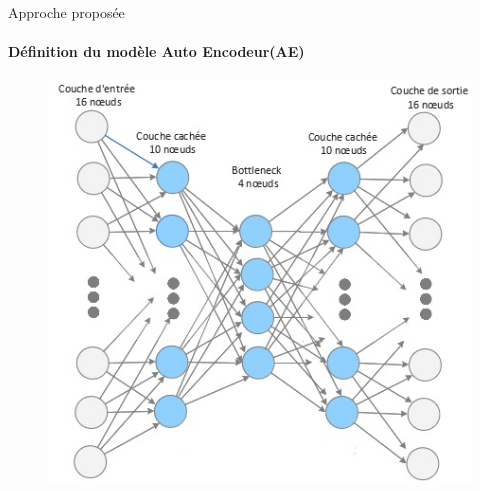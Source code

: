 \documentclass[aspectratio=169,professionalfonts, 12pt]{beamer}
\begin{document}
\begin{frame}{Approche proposée}
	\framesubtitle{Définition du modèle Auto Encodeur(AE) }
\begin{minipage}{0.4\textwidth}
	\begin{figure}[t]
	       \centering
 \includegraphics[height=0.7\textheight]{images/ModelAE}
	    \end{figure}
\end{minipage}
\end{frame}
\end{document}
